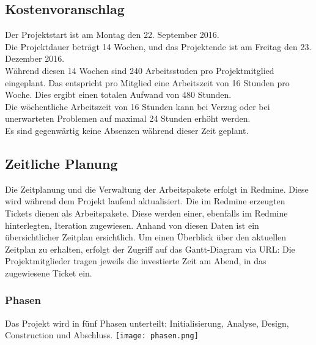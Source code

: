 \documentclass[a4,12pt]{scrartcl}
\begin{document}
\subsection{Kostenvoranschlag}
Der Projektstart ist am Montag den 22. September 2016. \\
Die Projektdauer beträgt 14 Wochen, und das Projektende ist am Freitag den 23. Dezember 2016. \\


\noindent Während diesen 14 Wochen sind 240 Arbeitsstuden pro Projektmitglied eingeplant. Das entspricht pro Mitglied eine Arbeitszeit von 16 Stunden pro Woche. Dies ergibt einen totalen Aufwand von 480 Stunden.\\

\noindent Die wöchentliche Arbeitszeit von 16 Stunden kann bei Verzug oder bei unerwarteten Problemen auf maximal 24 Stunden erhöht werden. \\

\noindent Es sind gegenwärtig keine Absenzen während dieser Zeit geplant. 
\subsection{Zeitliche Planung}
Die Zeitplanung und die Verwaltung der Arbeitspakete erfolgt in Redmine. Diese wird während dem Projekt laufend aktualisiert. Die im Redmine erzeugten Tickets dienen als Arbeitspakete. Diese werden einer, ebenfalls im Redmine hinterlegten, Iteration zugewiesen. Anhand von diesen Daten ist ein übersichtlicher Zeitplan ersichtlich. Um einen Überblick über den aktuellen Zeitplan zu erhalten, erfolgt der Zugriff auf das Gantt-Diagram via URL:
Die Projektmitglieder tragen jeweils die investierte Zeit am Abend, in das zugewiesene Ticket ein. 

\subsubsection{Phasen}
Das Projekt wird in fünf Phasen unterteilt: Initialisierung, Analyse, Design, Construction und Abschluss. 
\texttt{[image: phasen.png]}
\newpage
\end{document}
